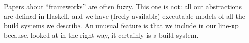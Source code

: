 Papers about ``frameworks'' are often fuzzy.  This one is not: all our
abstractions are defined in Haskell, and we have (freely-available)
executable models of all the build systems we describe.  An unusual
feature is that we include \Excel in our line-up because, looked at
in the right way, it certainly is a build system.

